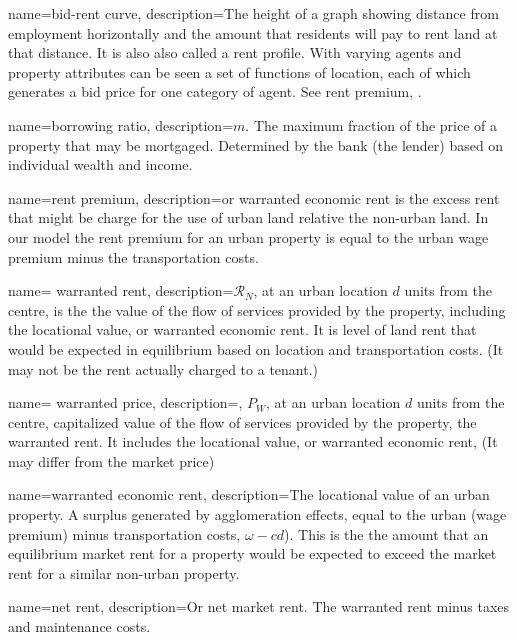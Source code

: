 {
name=bid-rent curve,
description={The height of a graph showing distance from employment horizontally and the amount that residents will pay to rent land at that distance. It is also also called a \gls{rent profile}. With varying agents and property attributes can be seen a set of functions of location, each of which  generates a bid price for one category of agent.   See \gls{rent premium}, .}
}

{
name=borrowing ratio,
description={$m$. The maximum fraction of the price of a property that may be mortgaged. Determined by the bank (the lender) based on individual wealth and income. }
}

{
name=rent premium,
description={or \gls{warranted economic rent} is the excess rent  that might be charge for the use of urban land relative the non-urban land. In our model the rent premium for an urban property is equal to the urban wage premium minus the transportation costs. }
}

{
name= warranted rent,
description={$\mathcal{R}_N$, at an  urban location  $d$ units from the centre, is the the value of the flow of services provided by the property, including the locational value, or \gls{warranted economic rent}. It is level of land rent that would be expected in equilibrium based on location and transportation costs.  (It may not be the rent actually charged to a tenant.) }
}

{
name= warranted price,
description={, $P_W$, at an  urban location  $d$ units from the centre, \gls{capitalize}d value of the flow of services provided by the property, the \gls{warranted rent}.  
It   includes  the locational value, or \gls{warranted economic rent}, (It may differ from the market price) }}

{
name=warranted economic rent,
description={The locational value of an urban property. A surplus generated by \glspl{agglomeration effect}, equal to the urban (wage premium) minus transportation costs, $\omega-{c} d$). This is the the amount that an equilibrium market rent for a property would be expected to exceed the market rent for a similar non-urban property.}
}

{
name=net rent,
description={Or net market rent. The \gls{warranted rent} minus taxes and maintenance costs.}
}


